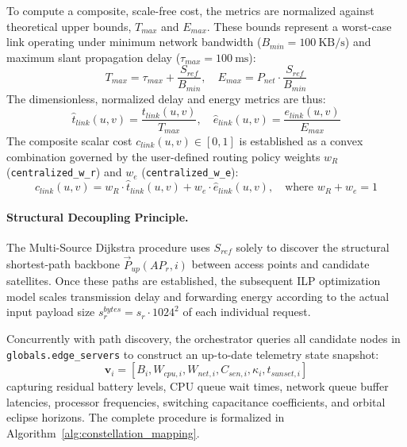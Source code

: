 To compute a composite, scale-free cost, the metrics are normalized against theoretical upper bounds, $T_{max}$ and $E_{max}$. 
These bounds represent a worst-case link operating under minimum network bandwidth ($B_{min} = 100~\text{KB/s}$) and maximum slant propagation delay ($\tau_{max} = 100~\text{ms}$):
\begin{equation}
    T_{max} = \tau_{max} + \frac{S_{ref}}{B_{min}}, \quad E_{max} = P_{net} \cdot \frac{S_{ref}}{B_{min}}
\end{equation}
The dimensionless, normalized delay and energy metrics are thus:
\begin{equation}
    \hat{t}_{link}(u,v) = \frac{t_{link}(u,v)}{T_{max}}, \quad \hat{e}_{link}(u,v) = \frac{e_{link}(u,v)}{E_{max}}
\end{equation}
The composite scalar cost $c_{link}(u,v) \in [0, 1]$ is established as a convex combination governed by the user-defined routing policy weights $w_R$ (\texttt{centralized\_w\_r}) and $w_e$ (\texttt{centralized\_w\_e}):
\begin{equation}
    c_{link}(u,v) = w_R \cdot \hat{t}_{link}(u,v) + w_e \cdot \hat{e}_{link}(u,v), \quad \text{where } w_R + w_e = 1
\end{equation}

\paragraph{Structural Decoupling Principle.} 
The Multi-Source Dijkstra procedure uses $S_{ref}$ solely to discover the structural shortest-path backbone $\vec{P}_{up}(AP_r, i)$ between access points and candidate satellites. 
Once these paths are established, the subsequent ILP optimization model scales transmission delay and forwarding energy according to the actual input payload size $s_r^{bytes} = s_r \cdot 1024^2$ of each individual request. 

Concurrently with path discovery, the orchestrator queries all candidate nodes in \texttt{globals.edge\_servers} to construct an up-to-date telemetry state snapshot:
\begin{equation}
    \mathbf{v}_i = \left[ B_i, W_{cpu,i}, W_{net,i}, C_{sen,i}, \kappa_i, t_{sunset,i} \right]
\end{equation}
capturing residual battery levels, CPU queue wait times, network queue buffer latencies, processor frequencies, switching capacitance coefficients, and orbital eclipse horizons. 
The complete procedure is formalized in Algorithm~\ref{alg:constellation_mapping}.

